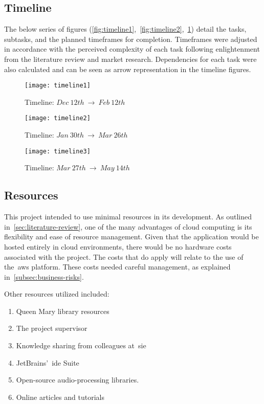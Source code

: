 \subsection{Timeline}\label{subsec:timeline}

The below series of figures (\ref{fig:timeline1},~\ref{fig:timeline2},~\ref{fig:timeline3}) detail the tasks, subtasks, and the planned timeframes for completion.
Timeframes were adjusted in accordance with the perceived complexity of each task following enlightenment from the literature review and market research.
Dependencies for each task were also calculated and can be seen as arrow representation in the timeline figures.

\begin{figure}[!htb]
    \minipage{\textwidth}
    \texttt{[image: timeline1]}
    \caption{Timeline: $Dec~12th~\rightarrow~Feb~12th$}\label{fig:timeline1}
    \endminipage\hfill
    \minipage{\textwidth}
    \texttt{[image: timeline2]}
    \caption{Timeline: $Jan~30th~\rightarrow~Mar~26th$}\label{fig:timeline2}
    \endminipage\hfill
    \minipage{\textwidth}
    \texttt{[image: timeline3]}
    \caption{Timeline: $Mar~27th~\rightarrow~May~14th$}\label{fig:timeline3}
    \endminipage
\end{figure}

\subsection{Resources}\label{subsec:resources}

This project intended to use minimal resources in its development.
As outlined in~\ref{sec:literature-review}, one of the many advantages of cloud computing is its flexibility and ease of resource management.
Given that the application would be hosted entirely in cloud environments, there would be no hardware costs associated with the project.
The costs that do apply will relate to the use of the~\gls{aws} platform.
These costs needed careful management, as explained in~\ref{subsec:business-risks}.

Other resources utilized included:

\begin{enumerate}
    \item Queen Mary library resources
    \item The project supervisor
    \item Knowledge sharing from colleagues at~\gls{sie}
    \item JetBrains’~\gls{ide} Suite
    \item Open-source audio-processing libraries.
    \item Online articles and tutorials
\end{enumerate}

